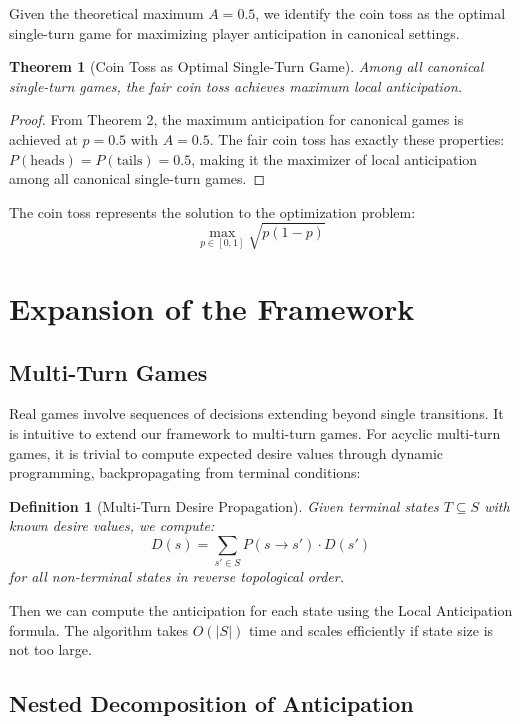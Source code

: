 \documentclass{article}
\newtheorem{definition}{Definition}
\newtheorem{theorem}{Theorem}
\begin{document}
Given the theoretical maximum $A = 0.5$, we identify the coin toss as the optimal single-turn game for maximizing player anticipation in canonical settings.

\begin{theorem}[Coin Toss as Optimal Single-Turn Game]
Among all canonical single-turn games, the fair coin toss achieves maximum local anticipation.
\end{theorem}

\begin{proof}
From Theorem 2, the maximum anticipation for canonical games is achieved at $p = 0.5$ with $A = 0.5$. The fair coin toss has exactly these properties: $P(\text{heads}) = P(\text{tails}) = 0.5$, making it the maximizer of local anticipation among all canonical single-turn games.
\end{proof}

The coin toss represents the solution to the optimization problem:
$$\max_{p \in [0,1]} \sqrt{p(1-p)}$$


\section{Expansion of the Framework}
\subsection{Multi-Turn Games}

Real games involve sequences of decisions extending beyond single transitions. It is intuitive to extend our framework to multi-turn games.
For acyclic multi-turn games, it is trivial to compute expected desire values through dynamic programming, backpropagating from terminal conditions:

\begin{definition}[Multi-Turn Desire Propagation]
Given terminal states $T \subseteq S$ with known desire values, we compute:
\begin{equation}
D(s) = \sum_{s' \in S} P(s \to s') \cdot D(s')
\end{equation}
for all non-terminal states in reverse topological order.
\end{definition}

Then we can compute the anticipation for each state using the Local Anticipation formula. The algorithm takes $O(|S|)$ time and scales efficiently if state size is not too large.

\subsection{Nested Decomposition of Anticipation}
\end{document}
